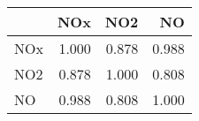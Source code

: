 \begin{tabular}{lrrr}
\toprule
{} &    NOx &    NO2 &     NO \\
\midrule
NOx &  1.000 &  0.878 &  0.988 \\
NO2 &  0.878 &  1.000 &  0.808 \\
NO  &  0.988 &  0.808 &  1.000 \\
\bottomrule
\end{tabular}

